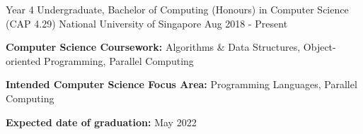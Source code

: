 

\begin{cventries}

  \cventry
    {Year 4 Undergraduate, Bachelor of Computing (Honours) in Computer Science (CAP 4.29)} %
    {National University of Singapore} %
    {} %
    {Aug 2018 - Present} %
    {
      \begin{cvitems} %
        \item {\textbf{Computer Science Coursework:} Algorithms \& Data Structures, Object-oriented Programming, Parallel Computing}
        \item {\textbf{Intended Computer Science Focus Area:} Programming Languages, Parallel Computing}
        \item {\textbf{Expected date of graduation:} May 2022}
      \end{cvitems}
    }

\end{cventries}

